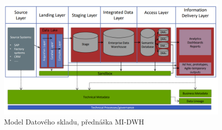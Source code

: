 \documentclass[thesis=M,czech]{FITthesis}[2022/10/08]
\begin{document}
\begin{figure}
    \centering
    \includegraphics[width=\textwidth]{DP-obrazky/DWH_architektura.png}
    \caption{Model Datového skladu, přednáška MI-DWH \cite{EDW2}}
    \label{fig:DWH_Model}
\end{figure}
\end{document}
